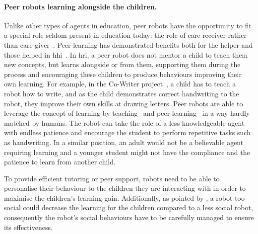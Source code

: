 	\paragraph{Peer robots learning alongside the children.}
	Unlike other types of agents in education, peer robots have the opportunity to fit a special role seldom present in education today: the role of care-receiver rather than care-giver~\citep{tanaka2012children}. Peer learning has demonstrated benefits both for the helper and those helped in \gls{hhi}~\citep{topping2005trends}. In \gls{hri}, a peer robot does not mentor a child to teach them new concepts, but learns alongside or from them, supporting them during the process and encouraging these children to produce behaviours improving their own learning. For example, in the Co-Writer project~\citep{hood2015children}, a child has to teach a robot how to write, and as the child demonstrates correct handwriting to the robot, they improve their own skills at drawing letters. Peer robots are able to leverage the concept of learning by teaching~\citep{frager1970learning} and peer learning~\citep{topping2005trends} in a way hardly matched by humans. The robot can take the role of a less knowledgeable agent with endless patience and encourage the student to perform repetitive tasks such as handwriting. In a similar position, an adult would not be a believable agent requiring learning and a younger student might not have the compliance and the patience to learn from another child.
	
	To provide efficient tutoring or peer support, robots need to be able to personalise their behaviour to the children they are interacting with in order to maximise the children's learning gain. Additionally, as pointed by \citet{kennedy2015robot}, a robot too social could decrease the learning for the children compared to a less social robot, consequently the robot's social behaviours have to be carefully managed to ensure its effectiveness. 
	
